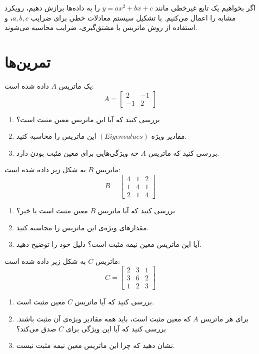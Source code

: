 اگر بخواهیم یک تابع غیرخطی مانند \(y = ax^2 + bx + c\) را به داده‌ها برازش دهیم، رویکرد مشابه را اعمال می‌کنیم. با تشکیل سیستم معادلات خطی برای ضرایب \(a, b, c\)، و استفاده از روش ماتریس یا مشتق‌گیری، ضرایب محاسبه می‌شوند.

\section{تمرین‌ها}
\begin{exercise}
	یک ماتریس \( A \) داده شده است:
	\[
	A = \begin{bmatrix}
		2 & -1 \\
		-1 & 2
	\end{bmatrix}
	\]
	\begin{enumerate}
		\item بررسی کنید که آیا این ماتریس معین مثبت است؟
		\item مقادیر ویژه $(Eigenvalues)$ این ماتریس را محاسبه کنید.
		\item بررسی کنید که ماتریس \( A \) چه ویژگی‌هایی برای معین مثبت بودن دارد.
	\end{enumerate}
\end{exercise}
\begin{exercise}
	ماتریس \( B \) به شکل زیر داده شده است:
	\[
	B = \begin{bmatrix}
		4 & 1 & 2 \\
		1 & 4 & 1 \\
		2 & 1 & 4
	\end{bmatrix}
	\]
	\begin{enumerate}
		\item بررسی کنید که آیا ماتریس \( B \) معین مثبت است یا خیر؟
		\item مقدارهای ویژه‌ی این ماتریس را محاسبه کنید.
		\item آیا این ماتریس معین نیمه مثبت است؟ دلیل خود را توضیح دهید.
	\end{enumerate}
\end{exercise}
\begin{exercise}
	ماتریس \( C \) به شکل زیر داده شده است:
	\[
	C = \begin{bmatrix}
		2 & 3 & 1 \\
		3 & 6 & 2 \\
		1 & 2 & 3
	\end{bmatrix}
	\]
	\begin{enumerate}
		\item بررسی کنید که آیا ماتریس \( C \) معین مثبت است.
		\item برای هر ماتریس \( A \) که معین مثبت است، باید همه مقادیر ویژه‌ی آن مثبت باشند. بررسی کنید که آیا این ویژگی برای \( C \) صدق می‌کند؟
		\item نشان دهید که چرا این ماتریس معین نیمه مثبت نیست.
	\end{enumerate}
\end{exercise}
